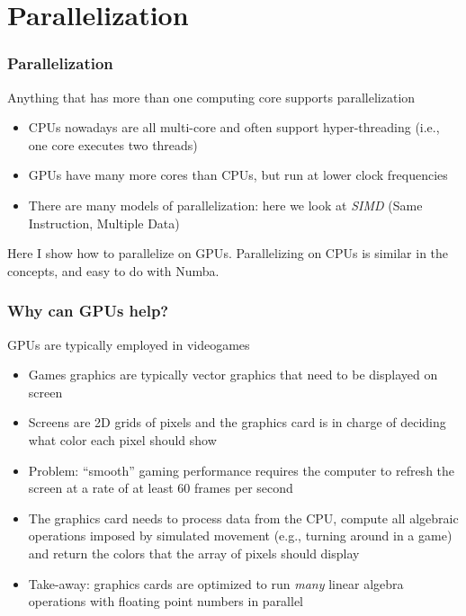 \documentclass[10pt, aspectratio=1610]{beamer}
\begin{document}
\section{Parallelization}

\begin{frame}
  \frametitle{Parallelization}

  Anything that has more than one computing core supports parallelization

  \begin{itemize}
    \item CPUs nowadays are all multi-core and often support hyper-threading (i.e., one core executes two threads)
    \item GPUs have many more cores than CPUs, but run at lower clock frequencies
    \item There are many models of parallelization: here we look at \emph{SIMD} (Same Instruction, Multiple Data)
  \end{itemize}

  Here I show how to parallelize on \alert{GPU}s.
  Parallelizing on CPUs is similar in the concepts, and easy to do with Numba.

\end{frame}

\begin{frame}
  \frametitle{Why can GPUs help?}

    GPUs are typically employed in videogames
    \begin{itemize}
      \item
        Games graphics are typically vector graphics that need to be displayed on screen
      \item
        Screens are 2D grids of pixels and the graphics card is in charge of deciding what color each pixel should show
      \item
        Problem: ``smooth'' gaming performance requires the computer to refresh the screen at a rate of at least 60 frames per second
      \item
        The graphics card needs to process data from the CPU, compute all algebraic operations imposed by simulated movement (e.g., turning around in a game) and return the colors that the array of pixels should display
      \item
        Take-away: graphics cards are optimized to run \emph{many} linear algebra operations with floating point numbers in parallel
    \end{itemize}

\end{frame}
\end{document}
